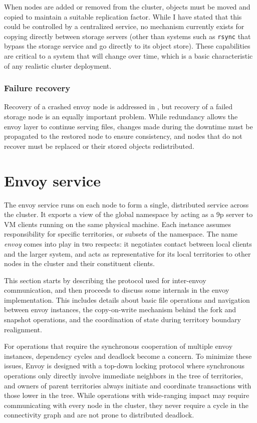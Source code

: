When nodes are added or removed from the cluster, objects must be moved and copied to maintain a suitable replication factor. While I have stated that this could be controlled by a centralized service, no mechanism currently exists for copying directly between storage servers (other than systems such as \texttt{rsync} that bypass the storage service and go directly to its object store). These capabilities are critical to a system that will change over time, which is a basic characteristic of any realistic cluster deployment.

\subsubsection{Failure recovery}

Recovery of a crashed envoy node is addressed in , but recovery of a failed storage node is an equally important problem. While redundancy allows the envoy layer to continue serving files, changes made during the downtime must be propagated to the restored node to ensure consistency, and nodes that do not recover must be replaced or their stored objects redistributed.

\section{Envoy service}

The envoy service runs on each node to form a single, distributed service across the cluster. It exports a view of the global namespace by acting as a 9p server to VM clients running on the same physical machine. Each instance assumes responsibility for specific territories, or subsets of the namespace. The name \emph{envoy} comes into play in two respects: it negotiates contact between local clients and the larger system, and acts as representative for its local territories to other nodes in the cluster and their constituent clients.

This section starts by describing the protocol used for inter-envoy communication, and then proceeds to discuss some internals in the envoy implementation. This includes details about basic file operations and navigation between envoy instances, the copy-on-write mechanism behind the fork and snapshot operations, and the coordination of state during territory boundary realignment.

For operations that require the synchronous cooperation of multiple envoy instances, dependency cycles and deadlock become a concern. To minimize these issues, Envoy is designed with a top-down locking protocol where synchronous operations only directly involve immediate neighbors in the tree of territories, and owners of parent territories always initiate and coordinate transactions with those lower in the tree. While operations with wide-ranging impact may require communicating with every node in the cluster, they never require a cycle in the connectivity graph and are not prone to distributed deadlock.

